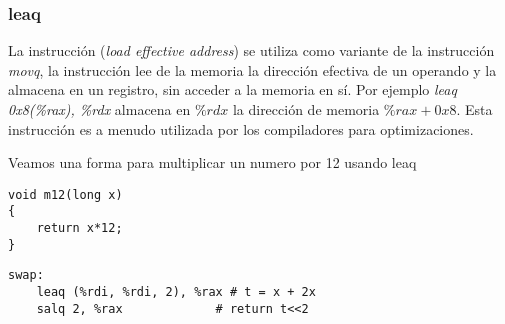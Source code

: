 \subsubsection{leaq}
La instrucción (\textit{load effective address}) se utiliza como variante de la instrucción \textit{movq},
la instrucción lee de la memoria la dirección efectiva de un operando y la almacena en un registro, sin acceder a la memoria en sí.
Por ejemplo \textit{leaq 0x8(\%rax), \%rdx} almacena en $\%rdx$ la dirección de memoria $\%rax + 0x8$. Esta instrucción es a menudo utilizada
por los compiladores para optimizaciones.
\begin{ejemplo}
	Veamos una forma para multiplicar un numero por 12 usando leaq
	\begin{center} %
		\begin{minipage}{0.3\textwidth}
			\begin{verbatim}
void m12(long x) 
{
    return x*12;
}
                \end{verbatim}
		\end{minipage}
		\begin{minipage}{0.69\textwidth}
			\begin{verbatim}
swap:
    leaq (%rdi, %rdi, 2), %rax # t = x + 2x
    salq 2, %rax             # return t<<2
                \end{verbatim}
		\end{minipage}
	\end{center}
\end{ejemplo}

